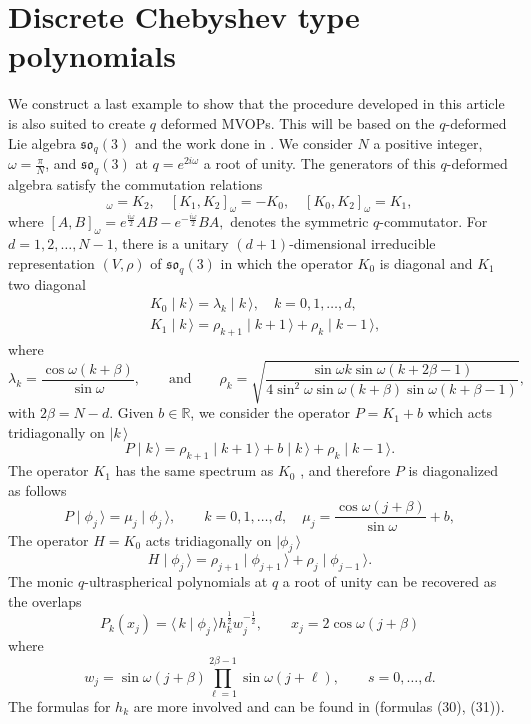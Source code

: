 \documentclass[a4paper,reqno]{amsart}
\theoremstyle{definition}
\numberwithin{equation}{section}
\newcommand{\bra}[1]{\langle\,{#1}}
\newcommand{\ket}[1]{\mid{#1}\,\rangle}
\begin{document}
\section{Discrete Chebyshev type polynomials}
\label{discrete Chebyshev}
We construct a last example to show that the procedure developed in this article is also suited to create $q$ deformed MVOPs. This will be based on the $q$-deformed Lie algebra $\mathfrak{so}_q(3)$ and the work done in \cite{Zhedanov96}.  We consider $N$ a positive integer, $\omega=\frac{\pi}{N}$, and  $\mathfrak{so}_q(3)$ at $q=e^{2i\omega}$  a root of unity. The generators of this $q$-deformed algebra satisfy the commutation relations
\begin{equation}
    [K_0,K_1]_\omega=K_2, \quad [K_1,K_2]_\omega=-K_0,\quad [K_0,K_2]_\omega=K_1,
\end{equation}
where $[A,B]_\omega = e^{\frac{i\omega}{2}}AB-e^{-\frac{i\omega}{2}}BA,$ denotes the symmetric $q$-commutator. For $d = 1, 2,\ldots,N-1$, there is a unitary $(d+1)$-dimensional  irreducible representation $(V,\rho)$ of $\mathfrak{so}_q(3)$  in which the operator $K_0$ is diagonal and $K_1$ two diagonal 
\begin{align}
&K_0 \ket{k}=\lambda_k\ket{k}, \quad k=0,1,\ldots,d, \\
&K_1 \ket{k}= \rho_{k+1}\ket{k+1}+\rho_k\ket{k-1},
\end{align}
where
\begin{equation}
\lambda_k=\frac{\cos\omega(k+\beta)}{\sin \omega},\qquad \text{and}\qquad \rho_k=\sqrt{\frac{\sin \omega k \sin\omega(k+2 \beta-1)}{4\sin^2\omega \sin\omega(k+\beta)\sin \omega (k+\beta-1)}},
\end{equation}
with $2\beta=N-d$. 
Given $b\in\mathbb{R}$, we consider the operator $P=K_1+b$ which acts tridiagonally on $\ket{k}$
\begin{equation}
    P\ket{k}=\rho_{k+1}\ket{k+1}+b\ket{k}+\rho_k\ket{k-1}.
\end{equation}
The operator $K_1$ has the same spectrum as $K_0$ \cite{Zhedanov96,Crampe2021}, and therefore $P$ is diagonalized as follows
\begin{equation}
    P\ket{\phi_j}=\mu_j\ket{\phi_j}, \qquad k=0,1,\ldots,d, \quad \mu_j=\frac{\cos \omega(j+\beta)}{\sin\omega}+b,
\end{equation}
The operator $H=K_0$ acts tridiagonally on $\ket{\phi_j}$ 
\begin{equation}
H\ket{\phi_j}=\rho_{j+1}\ket{\phi_{j+1}}+\rho_j\ket{\phi_{j-1}}.
\end{equation}
The monic $q$-ultraspherical polynomials at $q$ a root of unity can be recovered as the overlaps
\begin{equation}
    P_k(x_j)=\bra{k}\ket{\phi_j}h_k^{\frac{1}{2}}w_j^{-\frac{1}{2}},\qquad x_j=2\cos\omega(j+\beta)
\end{equation}
where
\begin{equation}
\label{eq:weight-norm-scalar-q-cheb}
w_j=\sin\omega(j+\beta)\prod_{\ell=1}^{2\beta-1}\sin \omega (j+\ell),\qquad  s=0,\ldots ,d .
\end{equation}
The formulas for $h_k$ are more involved and can be found in \cite{Zhedanov96} (formulas (30), (31)). 
\end{document}
